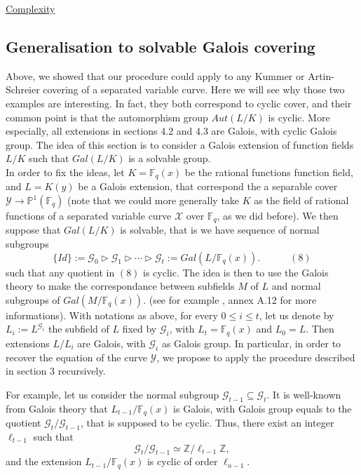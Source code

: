 \documentclass[10pt]{article}
\newcommand{\s}{\vspace{0.3cm}}
\newcommand{\Z}{\mathbb{Z}}
\newcommand{\fq}{\mathbb{F}_q}
\newcommand{\su}{\subseteq}
\newcommand{\X}{\mathcal{X}}
\newcommand{\Y}{\mathcal{Y}}
\newcommand{\G}{\mathcal{G}}
\begin{document}
\s

\underline{Complexity}

\s

\subsection{Generalisation to solvable Galois covering}

\s

Above, we showed that our procedure could apply to any Kummer or Artin-Schreier covering of a separated variable curve. Here we will see why those two examples are interesting. In fact, they both correspond to cyclic cover, and their common point is that the automorphism group $Aut(L/K)$ is cyclic. More especially, all extensions in sections 4.2 and 4.3 are Galois, with cyclic Galois group. The idea of this section is to consider a Galois extension of function fields $L/K$ such that $Gal(L/K)$ is a solvable group. \\
In order to fix the ideas, let $K=\fq(x)$ be the rational functions function field, and $L=K(y)$ be a Galois extension, that correspond the a separable cover $\Y \rightarrow \mathbb{P}^1(\fq)$ (note that we could more generally take $K$ as the field of rational functions of a separated variable curve $\X$ over $\fq$, as we did before). We then suppose that $Gal(L/K)$ is solvable, that is we have sequence of normal subgroups
\[ \{Id\} := \G_0 \triangleright \G_1 \triangleright \cdots \triangleright \G_t := Gal(L/\fq(x)). \quad \quad \quad (8)\]
such that any quotient in $(8)$ is cyclic.
The idea is then to use the Galois theory to make the correspondance between subfields $M$ of $L$ and normal subgroups of $Gal(M/\fq(x))$. (see for example \cite{Sti}, annex A.12 for more informations). 
With notations as above, for every $0 \leq i \leq t$, let us denote by $L_i := L^{\G_i}$ the subfield of $L$ fixed by $\G_i$, with $L_t=\fq(x)$ and $L_0=L$. Then  extensions $L/L_i$ are Galois, with $\G_i$ as Galois group. In particular, in order to recover the equation of the curve $\Y$, we propose to apply the procedure described in section 3 recursively. 

 \s
 
For example, let us consider the normal subgroup $\G_{t-1} \su \G_t$. It is well-known from Galois theory that $L_{t-1}/\fq(x)$ is Galois, with Galois group equals to the quotient $\G_t/\G_{t-1}$, that is supposed to be cyclic. Thus, there exist an integer $\ell_{t-1}$ such that 
\[ \G_t/\G_{t-1} \simeq \Z/\ell_{t-1}\Z,\] 
and the extension $L_{t-1}/\fq(x)$ is cyclic of order $\ell_{n-1}$. 
\end{document}
